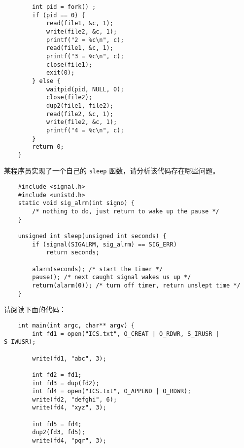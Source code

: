 \begin{problems}
\begin{verbatim}
        int pid = fork() ;
        if (pid == 0) {
            read(file1, &c, 1);
            write(file2, &c, 1);
            printf("2 = %c\n", c);
            read(file1, &c, 1);
            printf("3 = %c\n", c);
            close(file1);
            exit(0);
        } else {
            waitpid(pid, NULL, 0);
            close(file2);
            dup2(file1, file2);
            read(file2, &c, 1);
            write(file2, &c, 1);
            printf("4 = %c\n", c);
        }
        return 0;
    }
        \end{verbatim}
         某程序员实现了一个自己的 \verb|sleep| 函数，请分析该代码存在哪些问题。
        \begin{verbatim}
    #include <signal.h>
    #include <unistd.h>
    static void sig_alrm(int signo) {
        /* nothing to do, just return to wake up the pause */
    }

    unsigned int sleep(unsigned int seconds) {
        if (signal(SIGALRM, sig_alrm) == SIG_ERR)
            return seconds;

        alarm(seconds); /* start the timer */
        pause(); /* next caught signal wakes us up */
        return(alarm(0)); /* turn off timer, return unslept time */
    }
        \end{verbatim}
         请阅读下面的代码：
        \begin{verbatim}
    int main(int argc, char** argv) {
        int fd1 = open("ICS.txt", O_CREAT | O_RDWR, S_IRUSR | S_IWUSR);
        
        write(fd1, "abc", 3);

        int fd2 = fd1;
        int fd3 = dup(fd2);
        int fd4 = open("ICS.txt", O_APPEND | O_RDWR);
        write(fd2, "defghi", 6);
        write(fd4, "xyz", 3);

        int fd5 = fd4;
        dup2(fd3, fd5);
        write(fd4, "pqr", 3);


\end{verbatim}
\end{problems}
